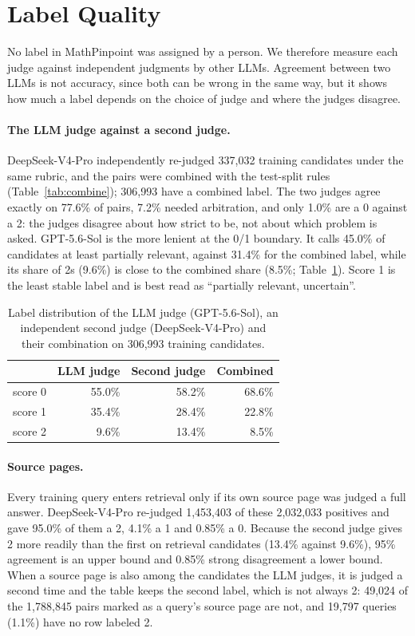 \section{Label Quality}
\label{sec:quality}

No label in MathPinpoint was assigned by a person. We therefore measure each judge against independent judgments by other LLMs. Agreement between two LLMs is not accuracy, since both can be wrong in the same way, but it shows how much a label depends on the choice of judge and where the judges disagree.

\paragraph{The LLM judge against a second judge.}
DeepSeek-V4-Pro independently re-judged 337,032 training candidates under the same rubric, and the pairs were combined with the test-split rules (Table~\ref{tab:combine}); 306,993 have a combined label. The two judges agree exactly on 77.6\% of pairs, 7.2\% needed arbitration, and only 1.0\% are a 0 against a 2: the judges disagree about how strict to be, not about which problem is asked. GPT-5.6-Sol is the more lenient at the 0/1 boundary. It calls 45.0\% of candidates at least partially relevant, against 31.4\% for the combined label, while its share of 2s (9.6\%) is close to the combined share (8.5\%; Table~\ref{tab:second-judge}). Score 1 is the least stable label and is best read as ``partially relevant, uncertain''.

\begin{table}[t]
\centering
\small
\begin{tabular}{lrrr}
\toprule
 & LLM judge & Second judge & Combined \\
\midrule
score 0 & 55.0\% & 58.2\% & 68.6\% \\
score 1 & 35.4\% & 28.4\% & 22.8\% \\
score 2 & 9.6\% & 13.4\% & 8.5\% \\
\bottomrule
\end{tabular}
\caption{Label distribution of the LLM judge (GPT-5.6-Sol), an independent second judge (DeepSeek-V4-Pro) and their combination on 306,993 training candidates.}
\label{tab:second-judge}
\end{table}

\paragraph{Source pages.}
Every training query enters retrieval only if its own source page was judged a full answer. DeepSeek-V4-Pro re-judged 1,453,403 of these 2,032,033 positives and gave 95.0\% of them a 2, 4.1\% a 1 and 0.85\% a 0. Because the second judge gives 2 more readily than the first on retrieval candidates (13.4\% against 9.6\%), 95\% agreement is an upper bound and 0.85\% strong disagreement a lower bound. When a source page is also among the candidates the LLM judges, it is judged a second time and the table keeps the second label, which is not always 2: 49,024 of the 1,788,845 pairs marked as a query's source page are not, and 19,797 queries (1.1\%) have no row labeled 2.

